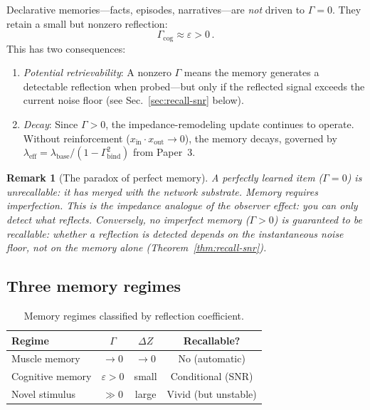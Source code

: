 \documentclass[aps,pre,twocolumn,superscriptaddress,floatfix]{revtex4-2}
\newtheorem{remark}{Remark}
\begin{document}
Declarative memories---facts, episodes, narratives---are
\emph{not} driven to $\Gamma=0$.  They retain a small but
nonzero reflection:
\begin{equation}
  \Gamma_{\text{cog}} \approx \varepsilon > 0\,.
  \label{eq:cog-memory}
\end{equation}
This has two consequences:
\begin{enumerate}
  \item \emph{Potential retrievability}: A nonzero $\Gamma$ means the
    memory generates a detectable reflection when probed---but
    only if the reflected signal exceeds the current noise floor
    (see Sec.~\ref{sec:recall-snr} below).
  \item \emph{Decay}: Since $\Gamma>0$, the impedance-remodeling update
    continues to operate.  Without reinforcement
    ($x_{\text{in}}\cdot x_{\text{out}}\to 0$), the memory
    decays, governed by
    $\lambda_{\text{eff}}=\lambda_{\text{base}}/(1-\Gamma_{\text{bind}}^2)$
    from Paper~3.
\end{enumerate}

\begin{remark}[The paradox of perfect memory]
A perfectly learned item ($\Gamma=0$) is \emph{unrecallable}:
it has merged with the network substrate.
Memory requires imperfection.
This is the impedance analogue of the observer effect:
you can only detect what reflects.
Conversely, no imperfect memory ($\Gamma>0$) is
\emph{guaranteed} to be recallable:
whether a reflection is detected depends on the
instantaneous noise floor, not on the memory alone
(Theorem~\ref{thm:recall-snr}).
\end{remark}

\subsection{Three memory regimes}

\begin{table}[h]
\centering
\caption{Memory regimes classified by reflection coefficient.}
\label{tab:memory-regimes}
\begin{tabular}{@{}lccc@{}}
\toprule
Regime & $\Gamma$ & $\Delta Z$ & Recallable? \\
\midrule
Muscle memory & $\to 0$ & $\to 0$ & No (automatic) \\
Cognitive memory & $\varepsilon>0$ & small & Conditional (SNR) \\
Novel stimulus & $\gg 0$ & large & Vivid (but unstable) \\
\bottomrule
\end{tabular}
\end{table}
\end{document}
